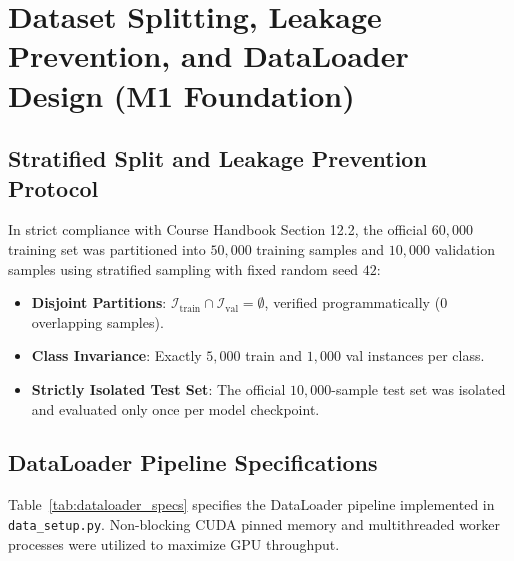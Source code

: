 \documentclass[11pt, a4paper]{article}
\begin{document}
\section{Dataset Splitting, Leakage Prevention, and DataLoader Design (M1 Foundation)}
\label{sec:data_splitting}

\subsection{Stratified Split and Leakage Prevention Protocol}
In strict compliance with Course Handbook Section 12.2, the official $60{,}000$ training set was partitioned into $50{,}000$ training samples and $10{,}000$ validation samples using stratified sampling with fixed random seed $42$:
\begin{itemize}[noitemsep]
  \item \textbf{Disjoint Partitions}: $\mathcal{I}_{\text{train}} \cap \mathcal{I}_{\text{val}} = \emptyset$, verified programmatically ($0$ overlapping samples).
  \item \textbf{Class Invariance}: Exactly $5{,}000$ train and $1{,}000$ val instances per class.
  \item \textbf{Strictly Isolated Test Set}: The official $10{,}000$-sample test set was isolated and evaluated only once per model checkpoint.
\end{itemize}

\subsection{DataLoader Pipeline Specifications}
Table~\ref{tab:dataloader_specs} specifies the DataLoader pipeline implemented in \texttt{data\_setup.py}. Non-blocking CUDA pinned memory and multithreaded worker processes were utilized to maximize GPU throughput.
\end{document}
